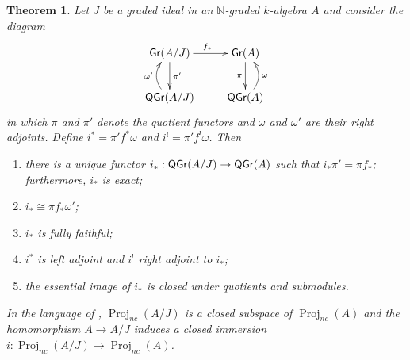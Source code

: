 \documentclass[10pt]{amsart}
\newtheorem{theorem}[lemma]{Theorem}
\numberwithin{equation}{section}
\def\NN{{\mathbb N}}
\def\Gr{{\sf Gr}}
\def\Projnc{\operatorname{Proj}_{nc}}
\def\QGr{\operatorname{\sf QGr}}
\begin{document}
\begin{theorem}
\label{thm.closed.proj}
\label{thm.3.2}
Let $J$ be a graded ideal in an $\NN$-graded $k$-algebra $A$ and consider the diagram
$$
\xymatrix{
\Gr (A/J) \ar[r]^{f_*}  \ar[d]^{\pi'}  & \Gr (A)  \ar[d]_{\pi}
\\ 
\QGr(A/J) \ar@/^1pc/[u]^{\omega'}  &  \QGr(A)  \ar@/_1pc/[u]_{\omega}
}
$$
in which $\pi$ and $\pi'$ denote the quotient functors and $\omega$ and $\omega'$ are their right adjoints.
Define $i^*= \pi' f^*\omega$ and $i^!= \pi' f^!\omega$. Then 
\begin{enumerate}
\item{}
there is a unique functor $i_*:\QGr(A/J) \to \QGr(A)$ such that $i_* \pi' = \pi f_*$; furthermore, $i_*$ is exact;
\item{}
 $i_* \cong \pi f_*\omega'$;
   \item 
  $i_*$ is fully faithful;
  \item 
  $i^*$ is left adjoint and $i^!$ right adjoint to $i_*$; 
  \item 
  the essential image of $i_*$ is closed under quotients and submodules.
\end{enumerate}
In the language of \cite{S},  $\Projnc (A/J)$ is a closed subspace of $\Projnc(A)$ and the homomorphism $A \to A/J$ induces a closed immersion 
$i:\Projnc (A/J) \to \Projnc( A)$. 
\end{theorem}
\end{document}

